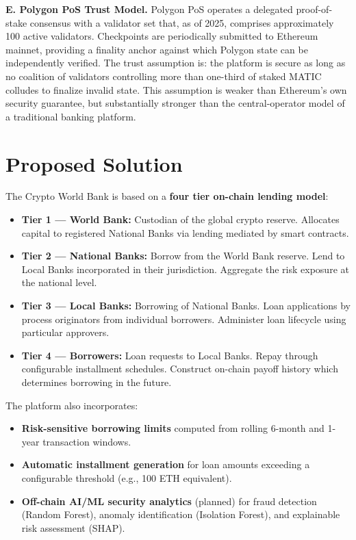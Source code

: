 \documentclass[12pt,a4paper]{report}
\begin{document}
\textbf{E. Polygon PoS Trust Model.}
Polygon PoS operates a delegated proof-of-stake consensus with a validator set that, as of 2025, comprises approximately 100 active validators. Checkpoints are periodically submitted to Ethereum mainnet, providing a finality anchor against which Polygon state can be independently verified. The trust assumption is: the platform is secure as long as no coalition of validators controlling more than one-third of staked MATIC colludes to finalize invalid state. This assumption is weaker than Ethereum's own security guarantee, but substantially stronger than the central-operator model of a traditional banking platform.

\section{Proposed Solution}

The Crypto World Bank is based on a \textbf{four tier on-chain lending model}:

\begin{itemize}[noitemsep]
\item \textbf{Tier 1 --- World Bank:} Custodian of the global crypto reserve. Allocates capital to registered National Banks via lending mediated by smart contracts.
\item \textbf{Tier 2 --- National Banks:} Borrow from the World Bank reserve. Lend to Local Banks incorporated in their jurisdiction. Aggregate the risk exposure at the national level.
\item \textbf{Tier 3 --- Local Banks:} Borrowing of National Banks. Loan applications by process originators from individual borrowers. Administer loan lifecycle using particular approvers.
\item \textbf{Tier 4 --- Borrowers:} Loan requests to Local Banks. Repay through configurable installment schedules. Construct on-chain payoff history which determines borrowing in the future.
\end{itemize}

The platform also incorporates:

\begin{itemize}[noitemsep]
\item \textbf{Risk-sensitive borrowing limits} computed from rolling 6-month and 1-year transaction windows.
\item \textbf{Automatic installment generation} for loan amounts exceeding a configurable threshold (e.g., 100 ETH equivalent).
\item \textbf{Off-chain AI/ML security analytics} (planned) for fraud detection (Random Forest), anomaly identification (Isolation Forest), and explainable risk assessment (SHAP).
\end{itemize}
\end{document}
